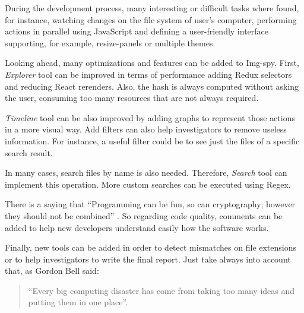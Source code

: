 During the development process, many interesting or difficult tasks where found,
for instance, watching changes on the file system of user's computer, performing
actions in parallel using JavaScript and defining a user-friendly interface
supporting, for example, resize-panels or multiple themes.

Looking ahead, many optimizations and features can be added to Img-spy. First,
\textit{Explorer} tool can be improved in terms of performance adding Redux
selectors and reducing React rerenders. Also, the hash is always computed
without asking the user, consuming too many resources that are not always
required.

\textit{Timeline} tool can be also improved by adding graphs to represent those
actions in a more visual way. Add filters can also help investigators to remove
useless information. For instance, a useful filter could be to see just the
files of a specific search result.

In many cases, search files by name is also needed. Therefore, \textit{Search}
tool can implement this operation. More custom searches can be executed using
Regex.

There is a saying that “Programming can be fun, so can cryptography; however
they should not be combined” \cite{code-complete}. So regarding code quality,
comments can be added to help new developers understand easily how the software 
works.

Finally, new tools can be added in order to detect mismatches on file 
extensions or to help investigators to write the final report. Just take always
into account that, as Gordon Bell said:

\begin{quote}
	“Every big computing disaster has come from taking too many ideas and putting them in one place”.
\end{quote}